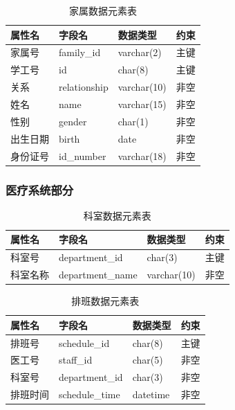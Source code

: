 \documentclass{article}
\begin{document}
\begin{table}[H]
    \centering
    \begin{tabularx}{\textwidth}{|>{\raggedright\arraybackslash}X|>{\raggedright\arraybackslash}X|>{\raggedright\arraybackslash}X|>{\raggedright\arraybackslash}X|}
    \toprule
    \textbf{属性名} & \textbf{字段名} & \textbf{数据类型} & \textbf{约束} \\ \midrule
    家属号 & family\_id & varchar(2) & 主键 \\ \midrule
    学工号 & id & char(8) & 主键 \\ \midrule
    关系 & relationship & varchar(10) & 非空 \\ \bottomrule
    姓名 & name & varchar(15) & 非空 \\ \midrule
    性别 & gender & char(1) & 非空 \\ \midrule
    出生日期 & birth & date & 非空 \\ \midrule
    身份证号 & id\_number & varchar(18) & 非空 \\ \bottomrule
    \end{tabularx}
    \caption{家属数据元素表}
    \label{tab:family_user_elements}
\end{table}

\subsubsection{医疗系统部分}

\begin{table}[H]
    \centering
    \begin{tabularx}{\textwidth}{|>{\raggedright\arraybackslash}X|>{\raggedright\arraybackslash}X|>{\raggedright\arraybackslash}X|>{\raggedright\arraybackslash}X|}
    \toprule
    \textbf{属性名} & \textbf{字段名} & \textbf{数据类型} & \textbf{约束} \\ \midrule
    科室号 & department\_id & char(3) & 主键 \\ \midrule
    科室名称 & department\_name & varchar(10) & 非空 \\ \bottomrule
    \end{tabularx}
    \caption{科室数据元素表}
    \label{tab:department_elements}
\end{table}

\begin{table}[H]
    \centering
    \begin{tabularx}{\textwidth}{|>{\raggedright\arraybackslash}X|>{\raggedright\arraybackslash}X|>{\raggedright\arraybackslash}X|>{\raggedright\arraybackslash}X|}
    \toprule
    \textbf{属性名} & \textbf{字段名} & \textbf{数据类型} & \textbf{约束} \\ \midrule
    排班号 & schedule\_id & char(8) & 主键 \\ \midrule
    医工号 & staff\_id & char(5) & 非空 \\ \midrule
    科室号 & department\_id & char(3) & 非空 \\ \midrule
    排班时间 & schedule\_time & datetime & 非空 \\
    \bottomrule
    \end{tabularx}
    \caption{排班数据元素表}
    \label{tab:schedule_elements}
\end{table}
\end{document}
